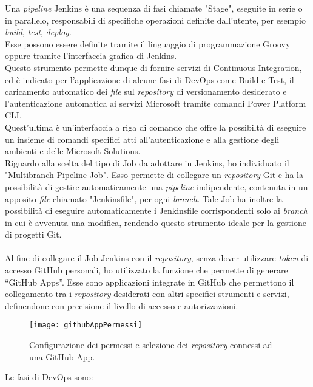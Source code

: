 \newpage \noindent Una \emph{pipeline} Jenkins è una sequenza di fasi chiamate "Stage", eseguite in serie o in parallelo, responsabili di specifiche operazioni definite dall'utente, per esempio \emph{build}, \emph{test}, \emph{deploy}.\\
Esse possono essere definite tramite il linguaggio di programmazione Groovy oppure tramite l'interfaccia grafica di Jenkins.\\
Questo strumento permette dunque di fornire servizi di \gls{Continuous Integration}, ed è indicato per l'applicazione di alcune fasi di \gls{DevOps} come Build e Test, il caricamento automatico dei \emph{file} sul \emph{repository} di versionamento desiderato e l'autenticazione automatica ai servizi Microsoft tramite comandi Power Platform CLI.\\
Quest'ultima è un'interfaccia a riga di comando che offre la possibiltà di eseguire un insieme di comandi specifici atti all'autenticazione e alla gestione degli ambienti e delle Microsoft Solutions.\\
Riguardo alla scelta del tipo di Job da adottare in Jenkins, ho individuato il "Multibranch Pipeline Job".
Esso permette di collegare un \emph{repository} Git e ha la possibilità di gestire automaticamente una \emph{pipeline} indipendente, contenuta in un apposito \emph{file} chiamato "Jenkinsfile", per ogni \emph{branch}.
Tale Job ha inoltre la possibilità di eseguire automaticamente i Jenkinsfile corrispondenti solo ai \emph{branch} in cui è avvenuta una modifica, rendendo questo strumento ideale per la gestione di progetti Git.\\\\
Al fine di collegare il Job Jenkins con il \emph{repository}, senza dover utilizzare \emph{token} di accesso GitHub personali, ho utilizzato la funzione che permette di generare “GitHub Apps”.
Esse sono applicazioni integrate in GitHub che permettono il collegamento tra i \emph{repository} desiderati con altri specifici strumenti e servizi, definendone con precisione il livello di accesso e autorizzazioni.  
\begin{figure}[htbp] 
    \centering 
    \texttt{[image: githubAppPermessi]} 
    \caption{Configurazione dei permessi e selezione dei \emph{repository} connessi ad una GitHub App.}
    \label{fig:githubAppPermessi}
\end{figure}

\noindent Le fasi di \gls{DevOps} sono:
